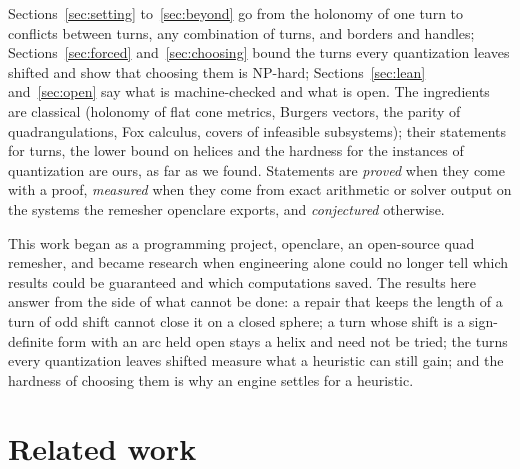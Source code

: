 \documentclass[11pt,a4paper]{article}
\begin{document}
Sections~\ref{sec:setting} to~\ref{sec:beyond} go from the holonomy of one
turn to conflicts between turns, any combination of turns, and borders and
handles; Sections~\ref{sec:forced} and~\ref{sec:choosing} bound the turns
every quantization leaves shifted and show that choosing them is NP-hard;
Sections~\ref{sec:lean} and~\ref{sec:open} say what is machine-checked and
what is open. The ingredients are classical (holonomy of flat cone metrics, Burgers vectors,
the parity of quadrangulations, Fox calculus, covers of infeasible
subsystems); their statements for turns, the lower bound on helices and the
hardness for the instances of quantization are ours, as far as we found.
Statements are \emph{proved} when they come with a proof, \emph{measured}
when they come from exact arithmetic or solver output on the systems the
remesher openclare exports, and \emph{conjectured} otherwise.

This work began as a programming project, openclare, an open-source quad
remesher, and became research when engineering alone could no longer tell
which results could be guaranteed and which computations saved. The results
here answer from the side of what cannot be done: a repair that keeps
the length of a turn of odd shift cannot close it on a closed sphere; a turn
whose shift is a sign-definite form with an arc held open stays a helix and
need not be tried; the turns every quantization leaves shifted measure what a
heuristic can still gain; and the hardness of choosing them is why an engine
settles for a heuristic.

\section{Related work}\label{sec:related}
\end{document}
